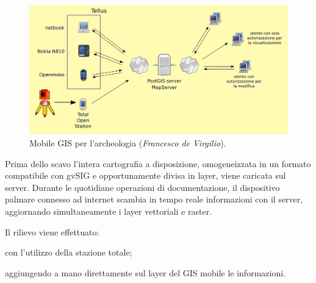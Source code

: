 \documentclass[portrait,final]{baposter}
\begin{document}
\begin{poster}
{	    \begin{figure}
                \vspace{-20pt}
                \begin{center}
                        \includegraphics[scale=0.4]{schematellus}
                \end{center}
                \vspace{-20pt}
                \caption{\small{Mobile GIS per l'archeologia (\emph{Francesco de Virgilio}).}\label{schema_tellus}}
                \vspace{-10pt}
            \end{figure}
        
	Prima dello scavo l'intera cartografia a disposizione, omogeneizzata
	in un formato compatibile con gvSIG e opportunamente
	divisa in layer, viene caricata sul server. Durante le quotidiane
	operazioni di documentazione, il dispositivo palmare connesso
	ad internet scambia in tempo reale informazioni con il server, aggiornando
	simultaneamente i layer vettoriali e raster.

	Il rilievo viene effettuato:
	
	\begin{enumerate*}
		\item con l'utilizzo della stazione totale;
		\item aggiungendo a mano direttamente sul layer del GIS mobile le informazioni.
	\end{enumerate*}

}
\end{poster}
\end{document}
